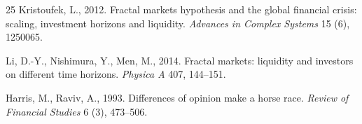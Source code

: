 \documentclass[preprint,12pt,authoryear]{elsarticle}
\begin{document}
\begin{thebibliography}{25}
Kristoufek, L., 2012.
Fractal markets hypothesis and the global financial crisis: scaling,
investment horizons and liquidity.
\textit{Advances in Complex Systems} 15 (6), 1250065.

Li, D.-Y., Nishimura, Y., Men, M., 2014.
Fractal markets: liquidity and investors on different time horizons.
\textit{Physica A} 407, 144--151.

Harris, M., Raviv, A., 1993.
Differences of opinion make a horse race.
\textit{Review of Financial Studies} 6 (3), 473--506.

\end{thebibliography}
\end{document}
